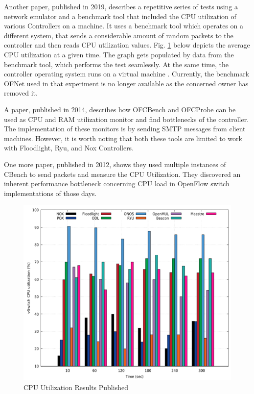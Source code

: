     Another paper, published in 2019, describes a repetitive series of tests using a network emulator and a benchmark tool that included the CPU utilization of various Controllers on a machine. It uses a benchmark tool which operates on a different system, that sends a considerable amount of random packets to the controller and then reads CPU utilization values. Fig. \ref{figzhu2019sdn} below depicts the average CPU utilization at a given time. The graph gets populated by data from the benchmark tool, which performs the test seamlessly. At the same time, the controller operating system runs on a virtual machine \cite{zhu2019sdn}. Currently, the benchmark OFNet used in that experiment is no longer available as the concerned owner has removed it.
    
    A paper, published in 2014, describes how OFCBench and OFCProbe can be used as CPU and RAM utilization monitor and find bottlenecks of the controller. The implementation of these monitors is by sending SMTP messages from client machines. However, it is worth noting that both these tools are limited to work with Floodlight, Ryu, and Nox Controllers. \cite{ofcprobe}
    
    One more paper, published in 2012, shows they used multiple instances of CBench to send packets and measure the CPU Utilization. They discovered an inherent performance bottleneck concerning CPU load in OpenFlow switch implementations of those days. \cite{flexible}
    
\begin{figure}[!hbt]
    \centering
        \includegraphics[width=\textwidth,keepaspectratio]{images/zhucpu.png}
       \caption{CPU Utilization Results Published \cite{zhu2019sdn}}
        \label{figzhu2019sdn}
\end{figure}

